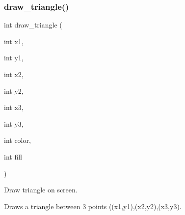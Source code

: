 \subsubsection{\texorpdfstring{draw\+\_\+triangle()}{draw\_triangle()}}
{\footnotesize\ttfamily int draw\+\_\+triangle (\begin{DoxyParamCaption}\item[{int}]{x1,  }\item[{int}]{y1,  }\item[{int}]{x2,  }\item[{int}]{y2,  }\item[{int}]{x3,  }\item[{int}]{y3,  }\item[{int}]{color,  }\item[{int}]{fill }\end{DoxyParamCaption})}



Draw triangle on screen. 

Draws a triangle between 3 points ((x1,y1),(x2,y2),(x3,y3).


